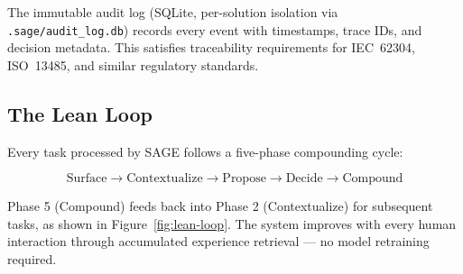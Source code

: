 \documentclass[11pt,a4paper]{article}
\begin{document}
The immutable audit log (SQLite, per-solution isolation via \texttt{.sage/audit\_log.db}) records every event with timestamps, trace IDs, and decision metadata. This satisfies traceability requirements for IEC~62304, ISO~13485, and similar regulatory standards.

\subsection{The Lean Loop}

Every task processed by SAGE follows a five-phase compounding cycle:

\begin{equation}
\text{Surface} \rightarrow \text{Contextualize} \rightarrow \text{Propose} \rightarrow \text{Decide} \rightarrow \text{Compound}
\label{eq:lean-loop}
\end{equation}

Phase 5 (Compound) feeds back into Phase 2 (Contextualize) for subsequent tasks, as shown in Figure~\ref{fig:lean-loop}. The system improves with every human interaction through accumulated experience retrieval --- no model retraining required.
\end{document}
